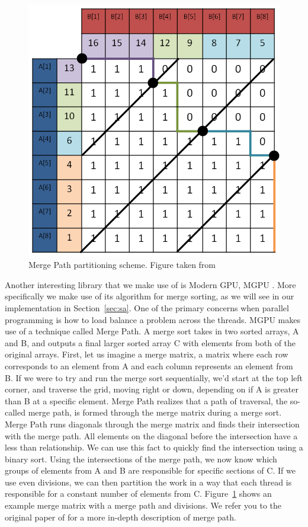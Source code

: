 \begin{figure}[ht!]
\centering
\includegraphics[width=1.0\textwidth]{images/MergePath.png}
\caption{Merge Path partitioning scheme. Figure taken from \cite{odeh2012merge}}
\label{fig:mgpu}
\end{figure}

Another interesting library that we make use of is Modern GPU, MGPU \cite{MGPU}.
More specifically we make use of its algorithm for merge sorting, as we will see in our implementation in Section~\ref{sec:sa}.
One of the primary concerns when parallel programming is how to load balance a problem across the threads.
MGPU makes use of a technique called Merge Path.
A merge sort takes in two sorted arrays, A and B, and outputs a final larger sorted array C with elements from both of the original arrays.
First, let us imagine a merge matrix, a matrix where each row corresponds to an element from A and each column represents an element from B.
If we were to try and run the merge sort sequentially, we'd start at the top left corner, and traverse the grid, moving right or down, depending on if A is greater than B at a specific element.
Merge Path realizes that a path of traversal, the so-called merge path, is formed through the merge matrix during a merge sort.
Merge Path runs diagonals through the merge matrix and finds their intersection with the merge path.
All elements on the diagonal before the intersection have a less than relationship.
We can use this fact to quickly find the intersection using a binary sort.
Using the intersections of the merge path, we now know which groups of elements from A and B are responsible for specific sections of C.
If we use even divisions, we can then partition the work in a way that each thread is responsible for a constant number of elements from C.
Figure~\ref{fig:mgpu} shows an example merge matrix with a merge path and divisions.
We refer you to the original paper of \cite{odeh2012merge} for a more in-depth description of merge path.

